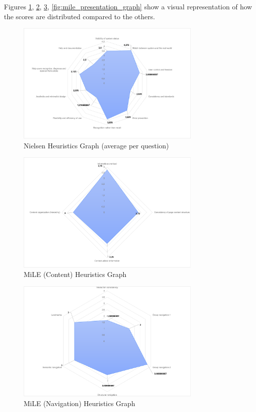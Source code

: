 Figures \ref{fig:nielsen_graph}, \ref{fig:mile_content_graph}, \ref{fig:mile_navigation_graph}, \ref{fig:mile_presentation_graph} show a visual representation of how the scores are distributed compared to the others.


\begin{figure}[h]
	\centering
	\includegraphics[width=0.8\textwidth]{img/nielsen_graph.png}
	\caption{Nielsen Heuristics Graph (average per question)}
	\label{fig:nielsen_graph}
\end{figure}

\begin{figure}[h]
	\centering
	\includegraphics[width=0.8\textwidth]{img/mile_content.png}
	\caption{MiLE (Content) Heuristics Graph}
	\label{fig:mile_content_graph}
\end{figure}

\begin{figure}[h]
	\centering
	\includegraphics[width=0.8\textwidth]{img/mile_navigation.png}
	\caption{MiLE (Navigation) Heuristics Graph}
	\label{fig:mile_navigation_graph}
\end{figure}

